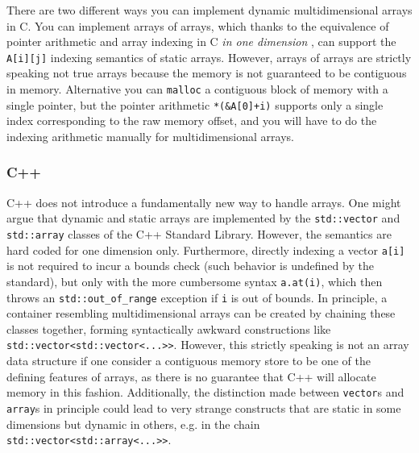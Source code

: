 \documentclass[preprint]{sigplanconf}
\newcommand{\code}[1]{\texttt{#1}}
\begin{document}
There are two different ways you can implement dynamic multidimensional arrays
in C. You can implement arrays of arrays, which thanks to the equivalence of
pointer arithmetic and array indexing in C \textit{in one dimension}
\cite[pp.~93--96]{Kernigham:1978cp}, can support the \code{A[i][j]} indexing
semantics of static arrays. However, arrays of arrays are strictly speaking
not true arrays because the memory is not guaranteed to be contiguous in
memory. Alternative you can \code{malloc} a contiguous block of memory with a
single pointer, but the pointer arithmetic \code{*(\&A[0]+i)} supports only a
single index corresponding to the raw memory offset, and you will have to do
the indexing arithmetic manually for multidimensional arrays.


\subsubsection{C++}


C++ does not introduce a fundamentally new way to handle arrays. One might
argue that dynamic and static arrays are implemented by the \code{std::vector}
and \code{std::array} classes of the C++ Standard Library. However, the
semantics are hard coded for one dimension only. Furthermore, directly
indexing a vector \code{a[i]} is not required to incur a bounds check (such
behavior is undefined by the standard), but only with the more cumbersome
syntax \code{a.at(i)}, which then throws an \code{std::out\_of\_range}
exception if \code{i} is out of bounds. In principle, a container resembling
multidimensional arrays can be created by chaining these classes together,
forming syntactically awkward constructions like
\code{std::vector<std::vector<...>>}. However, this strictly speaking is not
an array data structure if one consider a contiguous memory store to be one of
the defining features of arrays, as there is no guarantee that C++ will
allocate memory in this fashion. Additionally, the distinction made between
\code{vector}s and \code{array}s in principle could lead to very strange
constructs that are static in some dimensions but dynamic in others, e.g. in
the chain \code{std::vector<std::array<...>>}.
\end{document}
